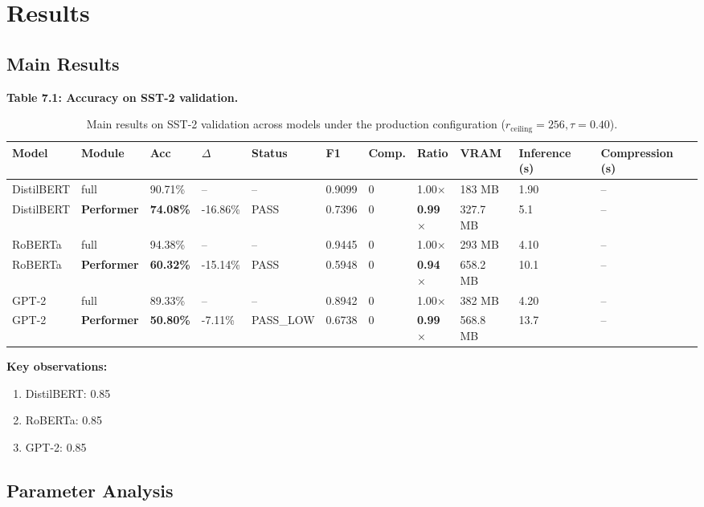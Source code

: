 
\section{Results}

\subsection{Main Results}

\textbf{Table 7.1: Accuracy on SST-2 validation.}

\begin{table}[t]
\centering
\small
\begin{tabular}{lllllllllll}
\toprule
\textbf{Model} & \textbf{Module} & \textbf{Acc} & \textbf{$\Delta$} & \textbf{Status} & \textbf{F1} & \textbf{Comp.} & \textbf{Ratio} & \textbf{VRAM} & \textbf{Inference (s)} & \textbf{Compression (s)} \\
\midrule
DistilBERT & full & 90.71\% & -- & -- & 0.9099 & 0 & 1.00$\times$ & 183 MB & 1.90 & -- \\
DistilBERT & \textbf{Performer} & \textbf{74.08\%} & -16.86\% & PASS & 0.7396 & 0 & \textbf{0.99$\times$} & 327.7 MB & 5.1 & -- \\
RoBERTa & full & 94.38\% & -- & -- & 0.9445 & 0 & 1.00$\times$ & 293 MB & 4.10 & -- \\
RoBERTa & \textbf{Performer} & \textbf{60.32\%} & -15.14\% & PASS & 0.5948 & 0 & \textbf{0.94$\times$} & 658.2 MB & 10.1 & -- \\
GPT-2 & full & 89.33\% & -- & -- & 0.8942 & 0 & 1.00$\times$ & 382 MB & 4.20 & -- \\
GPT-2 & \textbf{Performer} & \textbf{50.80\%} & -7.11\% & PASS\_LOW & 0.6738 & 0 & \textbf{0.99$\times$} & 568.8 MB & 13.7 & -- \\
\bottomrule
\end{tabular}
\caption{Main results on SST-2 validation across models under the production configuration ($r_{\mathrm{ceiling}}=256, \tau=0.40$).}
\label{tab:main_sst2}
\end{table}

\textbf{Key observations:}

\begin{enumerate}
\item DistilBERT: 0.85
\item RoBERTa: 0.85
\item GPT-2: 0.85

\end{enumerate}
\subsection{Parameter Analysis}

